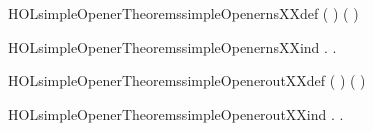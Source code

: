 \newcommand{\HOLsimpleOpenerTheoremssimpleCounterXXrules}{\UseVerbatim{HOLsimpleOpenerTheoremssimpleCounterXXrules}}
\begin{SaveVerbatim}{HOLsimpleOpenerTheoremssimpleOpenernsXXdef}
\HOLTokenTurnstile{} (   \HOLSymConst{=} ) \HOLSymConst{\HOLTokenConj{}} (   \HOLSymConst{=} )
\end{SaveVerbatim}
\newcommand{\HOLsimpleOpenerTheoremssimpleOpenernsXXdef}{\UseVerbatim{HOLsimpleOpenerTheoremssimpleOpenernsXXdef}}
\begin{SaveVerbatim}{HOLsimpleOpenerTheoremssimpleOpenernsXXind}
\HOLTokenTurnstile{} \HOLSymConst{\HOLTokenForall{}}.    \HOLSymConst{\HOLTokenConj{}}    \HOLSymConst{\HOLTokenConj{}}    \HOLSymConst{\HOLTokenConj{}}    \HOLSymConst{\HOLTokenImp{}} \HOLSymConst{\HOLTokenForall{}} .   
\end{SaveVerbatim}
\newcommand{\HOLsimpleOpenerTheoremssimpleOpenernsXXind}{\UseVerbatim{HOLsimpleOpenerTheoremssimpleOpenernsXXind}}
\begin{SaveVerbatim}{HOLsimpleOpenerTheoremssimpleOpeneroutXXdef}
\HOLTokenTurnstile{} (   \HOLSymConst{=} ) \HOLSymConst{\HOLTokenConj{}} (   \HOLSymConst{=} )
\end{SaveVerbatim}
\newcommand{\HOLsimpleOpenerTheoremssimpleOpeneroutXXdef}{\UseVerbatim{HOLsimpleOpenerTheoremssimpleOpeneroutXXdef}}
\begin{SaveVerbatim}{HOLsimpleOpenerTheoremssimpleOpeneroutXXind}
\HOLTokenTurnstile{} \HOLSymConst{\HOLTokenForall{}}.    \HOLSymConst{\HOLTokenConj{}}    \HOLSymConst{\HOLTokenConj{}}    \HOLSymConst{\HOLTokenConj{}}    \HOLSymConst{\HOLTokenImp{}} \HOLSymConst{\HOLTokenForall{}} .   
\end{SaveVerbatim}
\newcommand{\HOLsimpleOpenerTheoremssimpleOpeneroutXXind}{\UseVerbatim{HOLsimpleOpenerTheoremssimpleOpeneroutXXind}}
